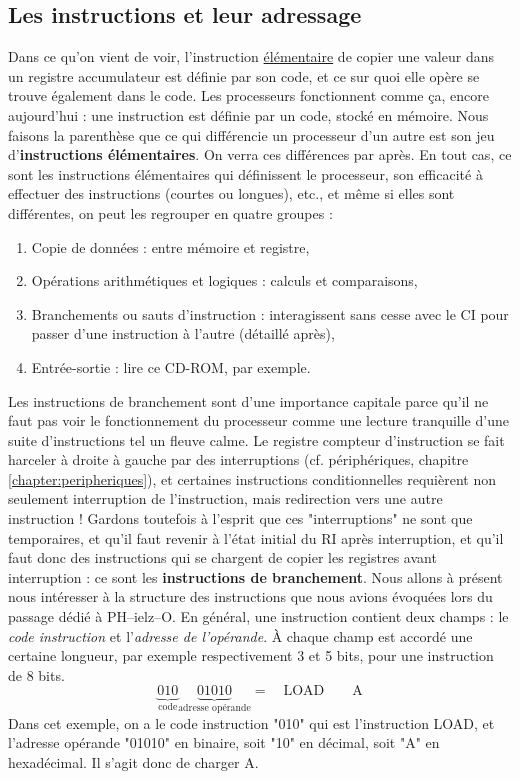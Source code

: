 \documentclass[12pt,a4paper]{report}
\begin{document}
\subsection{Les instructions et leur adressage}
Dans ce qu'on vient de voir, l'instruction \underline{élémentaire} de copier une valeur dans un registre accumulateur est définie par son code, et ce sur quoi elle opère se trouve également dans le code. Les processeurs fonctionnent comme ça, encore aujourd'hui : une instruction est définie par un code, stocké en mémoire. Nous faisons la parenthèse que ce qui différencie un processeur d'un autre est son jeu d'\textbf{instructions élémentaires}. On verra ces différences par après. En tout cas, ce sont les instructions élémentaires qui définissent le processeur, son efficacité à effectuer des instructions (courtes ou longues), etc., et même si elles sont différentes, on peut les regrouper en quatre groupes :
\begin{enumerate}
\item Copie de données : entre mémoire et registre,
\item Opérations arithmétiques et logiques : calculs et comparaisons,
\item Branchements ou sauts d'instruction : interagissent sans cesse avec le CI pour passer d'une instruction à l'autre (détaillé après),
\item Entrée-sortie : lire ce CD-ROM, par exemple.
\end{enumerate}
Les instructions de branchement sont d'une importance capitale parce qu'il ne faut pas voir le fonctionnement du processeur comme une lecture tranquille d'une suite d'instructions tel un fleuve calme. Le registre compteur d'instruction se fait harceler à droite à gauche par des interruptions (cf. périphériques, chapitre \ref{chapter:peripheriques}), et certaines instructions conditionnelles requièrent non seulement interruption de l'instruction, mais redirection vers une autre instruction ! Gardons toutefois à l'esprit que ces "interruptions" ne sont que temporaires, et qu'il faut revenir à l'état initial du RI après interruption, et qu'il faut donc des instructions qui se chargent de copier les registres avant interruption : ce sont les \textbf{instructions de branchement}.
Nous allons à présent nous intéresser à la structure des instructions que nous avions évoquées lors du passage dédié à PH--ielz--O. En général, une instruction contient deux champs : le \textit{code instruction} et l'\textit{adresse de l'opérande}. À chaque champ est accordé une certaine longueur, par exemple respectivement 3 et 5 bits, pour une instruction de 8 bits.
$$\underbrace{010}_{\text{code}}\underbrace{01010}_{\text{adresse opérande}}  = \quad  \text{LOAD} \qquad \text{A}$$
Dans cet exemple, on a le code instruction "010" qui est l'instruction LOAD, et l'adresse opérande "01010" en binaire, soit "10" en décimal, soit "A" en hexadécimal. Il s'agit donc de charger A.
\end{document}

